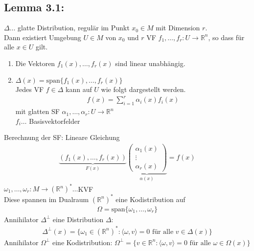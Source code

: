 \documentclass[ngerman]{tudscrreprt}
\begin{document}
\subsection*{Lemma 3.1:} $\Delta \dots$ glatte Distribution, regulär im Punkt $x_0 \in M$ mit Dimension $r$. \\ 
Dann existiert Umgebung $U\in M$ von $x_0$ und $r$ VF $f_1, \dots, f_r: U\to \mathbb{R}^n$, so dass für alle $x \in U$ gilt. 
\begin{enumerate}
\item Die Vektoren $f_1(x), \dots, f_r(x)$ sind linear unabhängig. 
\item $\Delta(x) = \text{span}\{ f_1(x), \dots, f_r(x) \}$\\ 
Jedes VF $f\in \Delta$ kann auf $U$ wie folgt dargestellt werden. \begin{align*} f(x) = \sum\limits_{i=1}^r \alpha_i(x) f_i(x) \end{align*} mit glatten SF $\alpha_1,\dots,\alpha_r: U\to \mathbb{R}^n$\\
$f_i\dots$ Basisvektorfelder
\end{enumerate}
Berechnung der SF: Lineare Gleichung
\begin{align*}
\underbrace{(f_1(x), \dots, f_r(x))}_{F(x)} \underbrace{\begin{pmatrix} \alpha_1(x)\\ \vdots\\ \alpha_r(x) \end{pmatrix}}_{\alpha(x)}= f(x)
\end{align*}
$\omega_1,\dots, \omega_r : M \to (\mathbb{R}^n)^*\dots $KVF\\ 
Diese spannen im Dualraum $(\mathbb{R}^n)^*$ eine Kodistribution auf \begin{align*} \Omega = \text{span}\{\omega_1,\dots, \omega_r\} \end{align*}
Annihilator $\Delta^\perp$ eine Distribution $\Delta:$ 
\begin{align*}
\Delta^{\perp}(x) = \{ \omega_1 \in (\mathbb{R}^n)^*: \langle \omega, v \rangle = 0 \text{ für alle } v\in \Delta(x) \}
\end{align*}
Annihilator $\Omega^{\perp}$ eine Kodistribution: $\Omega^\perp  = \{ v\in \mathbb{R}^n: \langle \omega, v \rangle = 0 \text{ für alle } \omega \in \Omega(x) \}$
\end{document}
